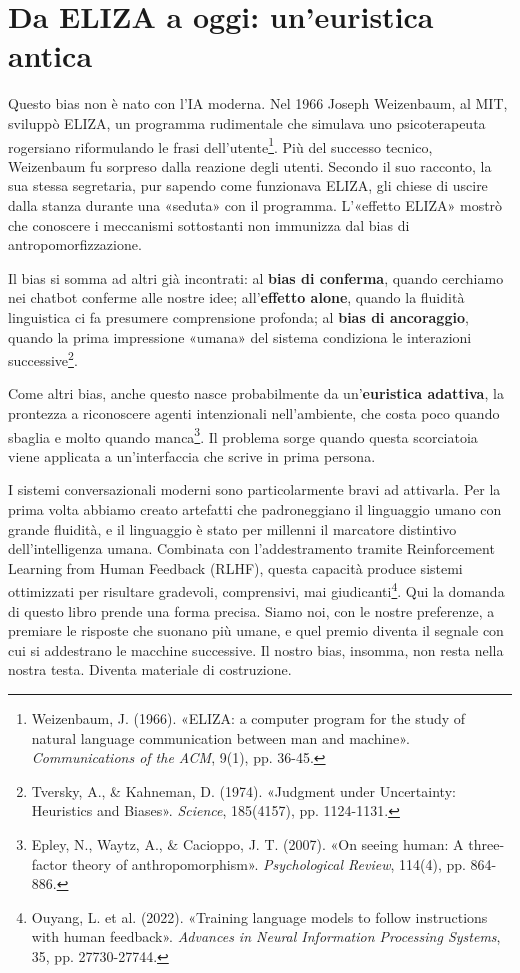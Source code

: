 \section{Da ELIZA a oggi: un'euristica antica}
\label{sec:p3c35-da-eliza-alla}
Questo bias non è nato con l'IA moderna. Nel 1966 Joseph Weizenbaum, al MIT, sviluppò ELIZA, un programma rudimentale che simulava uno psicoterapeuta rogersiano riformulando le frasi dell'utente\footnote{Weizenbaum, J. (1966). «ELIZA: a computer program for the study of natural language communication between man and machine». \textit{Communications of the ACM}, 9(1), pp. 36-45.}. Più del successo tecnico, Weizenbaum fu sorpreso dalla reazione degli utenti. Secondo il suo racconto, la sua stessa segretaria, pur sapendo come funzionava ELIZA, gli chiese di uscire dalla stanza durante una «seduta» con il programma. L'«effetto ELIZA» mostrò che conoscere i meccanismi sottostanti non immunizza dal bias di antropomorfizzazione.

Il bias si somma ad altri già incontrati: al \textbf{bias di conferma}, quando cerchiamo nei chatbot conferme alle nostre idee; all'\textbf{effetto alone}, quando la fluidità linguistica ci fa presumere comprensione profonda; al \textbf{bias di ancoraggio}, quando la prima impressione «umana» del sistema condiziona le interazioni successive\footnote{Tversky, A., \& Kahneman, D. (1974). «Judgment under Uncertainty: Heuristics and Biases». \textit{Science}, 185(4157), pp. 1124-1131.}.

Come altri bias, anche questo nasce probabilmente da un'\textbf{euristica adattiva}, la prontezza a riconoscere agenti intenzionali nell'ambiente, che costa poco quando sbaglia e molto quando manca\footnote{Epley, N., Waytz, A., \& Cacioppo, J. T. (2007). «On seeing human: A three-factor theory of anthropomorphism». \textit{Psychological Review}, 114(4), pp. 864-886.}. Il problema sorge quando questa scorciatoia viene applicata a un'interfaccia che scrive in prima persona.

I sistemi conversazionali moderni sono particolarmente bravi ad attivarla. Per la prima volta abbiamo creato artefatti che padroneggiano il linguaggio umano con grande fluidità, e il linguaggio è stato per millenni il marcatore distintivo dell'intelligenza umana. Combinata con l'addestramento tramite Reinforcement Learning from Human Feedback (RLHF), questa capacità produce sistemi ottimizzati per risultare gradevoli, comprensivi, mai giudicanti\footnote{Ouyang, L. et al. (2022). «Training language models to follow instructions with human feedback». \textit{Advances in Neural Information Processing Systems}, 35, pp. 27730-27744.}. Qui la domanda di questo libro prende una forma precisa. Siamo noi, con le nostre preferenze, a premiare le risposte che suonano più umane, e quel premio diventa il segnale con cui si addestrano le macchine successive. Il nostro bias, insomma, non resta nella nostra testa. Diventa materiale di costruzione.

